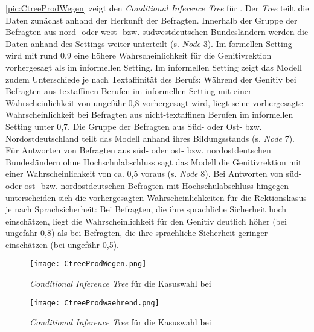 \autoref{pic:CtreeProdWegen} zeigt den \textit{Conditional Inference Tree} für \wegen. 
Der \textit{Tree} teilt die Daten zunächst anhand der Herkunft der Befragten. 
Innerhalb der Gruppe der Befragten aus nord- oder west- bzw. südwestdeutschen Bundesländern werden die Daten anhand des Settings weiter unterteilt (s. \textit{Node} 3). 
Im formellen Setting wird mit rund 0,9 eine höhere Wahrscheinlichkeit für die Genitivrektion vorhergesagt als im informellen Setting. 
Im informellen Setting zeigt das Modell zudem Unterschiede je nach Textaffinität des Berufs:
Während der Genitiv bei Befragten aus textaffinen Berufen im informellen Setting mit einer Wahrscheinlichkeit von ungefähr 0,8 vorhergesagt wird, liegt seine vorhergesagte Wahrscheinlichkeit bei Befragten aus nicht-textaffinen Berufen im informellen Setting unter 0,7. 
Die Gruppe der Befragten aus Süd- oder Ost- bzw. Nordostdeutschland teilt das Modell anhand ihres Bildungsstands (s. \textit{Node} 7). 
Für Antworten von Befragten aus süd- oder ost- bzw. nordostdeutschen Bundesländern ohne Hochschulabschluss sagt das Modell die Genitivrektion mit einer Wahrscheinlichkeit von ca. 0,5 voraus (s. \textit{Node} 8). 
Bei Antworten von süd- oder ost- bzw. nordostdeutschen Befragten mit Hochschulabschluss hingegen unterscheiden sich die vorhergesagten Wahrscheinlichkeiten für die Rektionskasus je nach Sprachsicherheit:
Bei Befragten, die ihre sprachliche Sicherheit hoch einschätzen, liegt die Wahrscheinlichkeit für den Genitiv deutlich höher (bei ungefähr 0,8) als bei Befragten, die ihre sprachliche Sicherheit geringer einschätzen (bei ungefähr 0,5). 

\begin{figure}
\centering
\texttt{[image: CtreeProdWegen.png]}
\caption{\textit{Conditional Inference Tree} für die Kasuswahl bei \wegen}
\label{pic:CtreeProdWegen}

\end{figure}
\begin{figure}
\centering
\texttt{[image: CtreeProdwaehrend.png]}
\caption{\textit{Conditional Inference Tree} für die Kasuswahl bei \waehrend}
\label{pic:CtreeProdWaehrend}
\end{figure}

